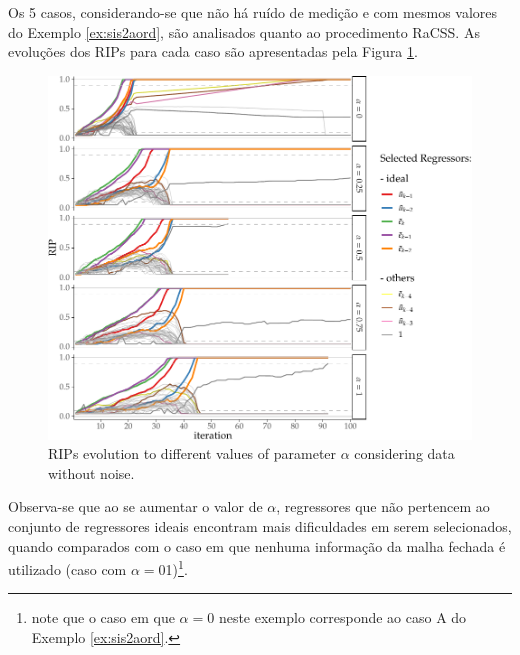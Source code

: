 \begin{exmp}
%
Os 5 casos, considerando-se que não há ruído de medição e com mesmos valores do Exemplo \ref{ex:sis2aord}, são analisados quanto ao procedimento RaCSS. As evoluções dos RIPs para cada caso são apresentadas pela Figura \ref{fig:exp51_ev_rips_a1_SR}.
  \begin{figure}[htpb]
    \centering
    \includegraphics{Figs/Cap5/ex51_rips_evol_SR.tex.pdf}
    \caption{RIPs evolution to different values of parameter $\alpha$ considering data without noise.}
    \label{fig:exp51_ev_rips_a1_SR}
  \end{figure}
Observa-se que ao se aumentar o valor de $\alpha$, regressores que não pertencem ao conjunto de regressores ideais encontram mais dificuldades em serem selecionados, quando comparados com o caso em que nenhuma informação da malha fechada é utilizado (caso com $\alpha=0$1)\footnote{note que o caso em que $\alpha=0$ neste exemplo corresponde ao caso A do Exemplo \ref{ex:sis2aord}.}.


\end{exmp}

